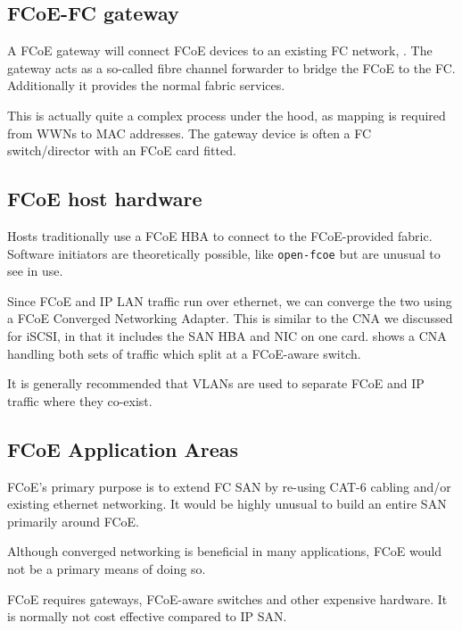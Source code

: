 \subsection{FCoE-FC gateway}
\label{sec:fcoe-fc-gateway}

A FCoE gateway will connect FCoE devices to an existing FC network, .
The gateway acts as a so-called fibre channel forwarder to bridge the
FCoE to the FC. Additionally it provides the normal fabric services.


This is actually quite a complex process under the hood, as mapping is
required from WWNs to MAC addresses. The gateway device is often a FC
switch/director with an FCoE card fitted.

\subsection{FCoE host hardware}
\label{sec:fcoe-host-hardware}

Hosts traditionally use a FCoE HBA to connect to the FCoE-provided
fabric. Software initiators are theoretically possible, like
\texttt{open-fcoe} but are unusual to see in use.

Since FCoE and IP LAN traffic run over ethernet, we can converge the two
using a FCoE Converged Networking Adapter. This is similar to the CNA we
discussed for iSCSI, in that it includes the SAN HBA and NIC on one
card. shows a CNA handling both sets of traffic which split at a
FCoE-aware switch.


It is generally recommended that VLANs are used to separate FCoE and IP
traffic where they co-exist.

\subsection{FCoE Application Areas}
\label{sec:fcoe-application-areas}

FCoE's primary purpose is to extend FC SAN by re-using CAT-6 cabling
and/or existing ethernet networking. It would be highly unusual to build
an entire SAN primarily around FCoE.

Although converged networking is beneficial in many applications, FCoE
would not be a primary means of doing so.

FCoE requires gateways, FCoE-aware switches and other expensive
hardware. It is normally not cost effective compared to IP SAN.

